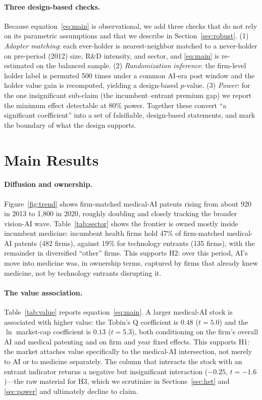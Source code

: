 \documentclass[12pt]{article}
\begin{document}
\paragraph{Three design-based checks.} Because equation~\eqref{eq:main} is observational, we add
three checks that do not rely on its parametric assumptions and that we describe in
Section~\ref{sec:robust}. (1) \emph{Adopter matching}: each ever-holder is nearest-neighbor matched
to a never-holder on pre-period (2012) size, R\&D intensity, and sector, and \eqref{eq:main} is
re-estimated on the balanced sample. (2) \emph{Randomization inference}: the firm-level holder
label is permuted 500 times under a common AI-era post window and the holder value gain is
recomputed, yielding a design-based $p$-value. (3) \emph{Power}: for the one insignificant
sub-claim (the incumbent--entrant premium gap) we report the minimum effect detectable at 80\%
power. Together these convert ``a significant coefficient'' into a set of falsifiable,
design-based statements, and mark the boundary of what the design supports.

\section{Main Results}\label{sec:res}
\paragraph{Diffusion and ownership.} Figure~\ref{fig:trend} shows firm-matched medical-AI patents
rising from about 920 in 2013 to 1{,}800 in 2020, roughly doubling and closely tracking the
broader vision-AI wave. Table~\ref{tab:sector} shows the frontier is owned mostly inside incumbent
medicine: incumbent health firms hold 47\% of firm-matched medical-AI patents (482 firms), against
19\% for technology entrants (135 firms), with the remainder in diversified ``other'' firms. This
supports H2: over this period, AI's move into medicine was, in ownership terms, captured by firms
that already knew medicine, not by technology entrants disrupting it.

\paragraph{The value association.} Table~\ref{tab:value} reports equation~\eqref{eq:main}. A
larger medical-AI stock is associated with higher value: the Tobin's Q coefficient is $0.48$
($t=5.0$) and the $\ln$ market-cap coefficient is $0.13$ ($t=5.3$), both conditioning on the
firm's overall AI and medical patenting and on firm and year fixed effects. This supports H1: the
market attaches value specifically to the medical-AI intersection, not merely to AI or to medicine
separately. The column that interacts the stock with an entrant indicator returns a negative but
insignificant interaction ($-0.25$, $t=-1.6$)---the raw material for H3, which we scrutinize in
Sections~\ref{sec:het} and \ref{sec:power} and ultimately decline to claim.
\end{document}
